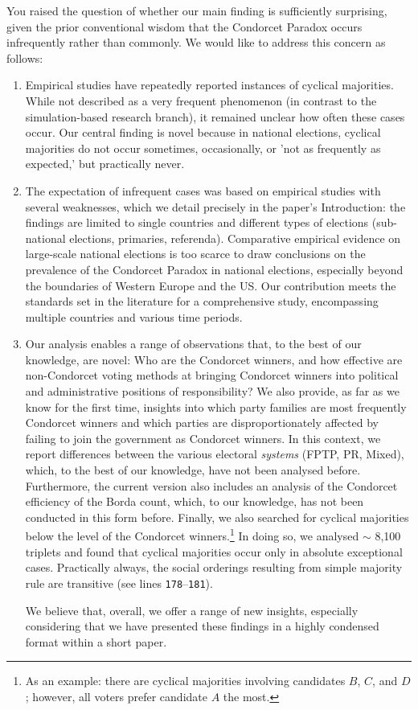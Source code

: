 \documentclass[a4paper, 12pt]{scrartcl}
\begin{document}
You raised the question of whether our main finding is sufficiently surprising, given the prior conventional wisdom that the Condorcet Paradox occurs infrequently rather than commonly. We would like to address this concern as follows:
\begin{enumerate}
\item Empirical studies have repeatedly reported instances of cyclical majorities. While not described as a very frequent phenomenon (in contrast to the simulation-based research branch), it remained unclear how often these cases occur. Our central finding is novel because in national elections, cyclical majorities do not occur sometimes, occasionally, or 'not as frequently as expected,' but practically never.
%
\item The expectation of infrequent cases was based on empirical studies with several weaknesses, which we detail precisely in the paper's Introduction: the findings are limited to single countries and different types of elections (sub-national elections, primaries, referenda). Comparative empirical evidence on large-scale national elections is too scarce to draw conclusions on the prevalence of the Condorcet Paradox in national elections, especially beyond the boundaries of Western Europe and the US. Our contribution meets the standards set in the literature for a comprehensive study, encompassing multiple countries and various time periods.
%
\item Our analysis enables a range of observations that, to the best of our knowledge, are novel: Who are the Condorcet winners, and how effective are non-Condorcet voting methods at bringing Condorcet winners into political and administrative positions of responsibility? We also provide, as far as we know for the first time, insights into which party families are most frequently Condorcet winners and which parties are disproportionately affected by failing to join the government as Condorcet winners. In this context, we report differences between the various electoral \emph{systems} (FPTP, PR, Mixed), which, to the best of our knowledge, have not been analysed before. Furthermore, the current version also includes an analysis of the Condorcet efficiency of the Borda count, which, to our knowledge, has not been conducted in this form before. Finally, we also searched for cyclical majorities below the level of the Condorcet winners.\footnote{
	 As an example: there are cyclical majorities involving candidates $B$, $C$, and $D$; however, all voters prefer candidate $A$ the most.
} In doing so, we analysed $\sim$ 8,100 triplets and found that cyclical majorities occur only in absolute exceptional cases. Practically always, the social orderings resulting from simple majority rule are transitive (see lines \texttt{178$–$181}).

We believe that, overall, we offer a range of new insights, especially considering that we have presented these findings in a highly condensed format within a short paper.
\end{enumerate}
\end{document}
